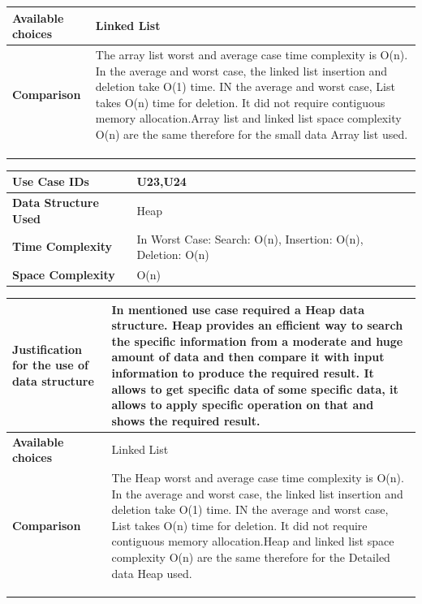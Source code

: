 \documentclass[12pt,a4paper]{report}
\begin{document}
\begin{center}
\begin{tabular}{ | m{4cm}|m{12cm}| }
 \\ \hline
\textbf{Available choices}& Linked List \\ \hline
\textbf{Comparison}&
The array list worst and average case time complexity is O(n). In the average and worst case, the linked list insertion and deletion take O(1) time. IN the average and worst case, List takes O(n) time for deletion. It did not require contiguous memory allocation.Array list and linked list space complexity O(n) are the same therefore for the small data Array list used.
\\
\\
 \\
 \\ \hline
\end{tabular}


\begin{tabular}{ | m{4cm}|m{12cm}| }\hline
\textbf{Use Case IDs}& U23,U24 \\ \hline
\textbf{Data Structure Used}& Heap \\ \hline

\textbf{Time Complexity}& 
In Worst Case: Search: O(n), Insertion: O(n), Deletion: O(n)\\\hline
\textbf{Space Complexity}& O(n)\\\hline

 \end{tabular}
\begin{tabular}{ | m{4cm}|m{12cm}| }\hline
\textbf{Justification for the use of data structure}&
In mentioned use case required a Heap data structure. 
Heap provides an efficient way to search the specific information from a moderate and huge amount of data and then compare it with input information to produce the required result. It allows to get specific data of some specific data, it allows to apply specific operation on that and shows the required result.
 
 \\ \hline
\textbf{Available choices}& Linked List \\ \hline
\textbf{Comparison}&
The Heap worst and average case time complexity is O(n). In the average and worst case, the linked list insertion and deletion take O(1) time. IN the average and worst case, List takes O(n) time for deletion. It did not require contiguous memory allocation.Heap and linked list space complexity O(n) are the same therefore for the Detailed  data Heap used.
\\
\\
\\
 \\ \hline
\end{tabular}


\end{center}
\end{document}

